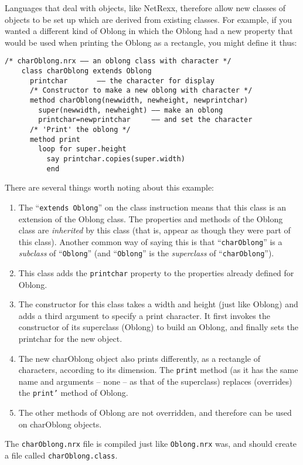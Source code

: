 Languages that deal with objects, like NetRexx, therefore allow new
classes of objects to be set up which are derived from existing
classes. For example, if you wanted a different kind of Oblong in
which the Oblong had a new property that would be used when printing
the Oblong as a rectangle, you might define it thus:
\begin{lstlisting}[label=charoblong,caption=charOblong.nrx]
    /* charOblong.nrx –– an oblong class with character */
    class charOblong extends Oblong
      printchar       –– the character for display
      /* Constructor to make a new oblong with character */
      method charOblong(newwidth, newheight, newprintchar)
        super(newwidth, newheight) –– make an oblong
        printchar=newprintchar     –– and set the character
      /* 'Print' the oblong */
      method print
        loop for super.height
          say printchar.copies(super.width)
          end
\end{lstlisting}
There are several things worth noting about this example:
\begin{enumerate}
\item The “\texttt{extends Oblong}” on the class instruction means that this class is an extension of the Oblong class. The properties and methods of the Oblong class are \emph{inherited} by this class (that is, appear as though they were part of this class).
Another common way of saying this is that “\texttt{charOblong}” is a \emph{subclass} of “\texttt{Oblong}” (and “\texttt{Oblong}” is the \emph{superclass} of “\texttt{charOblong}”).
\item This class adds the \texttt{printchar} property to the properties already defined for Oblong.
\item The constructor for this class takes a width and height (just like Oblong) and adds a third argument to specify a print character. It first invokes the constructor of its superclass (Oblong) to build an Oblong, and finally sets the printchar for the new object.
\item The new charOblong object also prints differently, as a rectangle of characters, according to its dimension. The \texttt{print} method (as it has the same name and arguments – none – as that of the superclass) replaces (overrides) the \texttt{print'} method of Oblong.
\item The other methods of Oblong are not overridden, and therefore
  can be used on charOblong objects.
\end{enumerate}
The \texttt{charOblong.nrx} file is compiled just like \texttt{Oblong.nrx} was, and
should create a file called \texttt{charOblong.class}.

